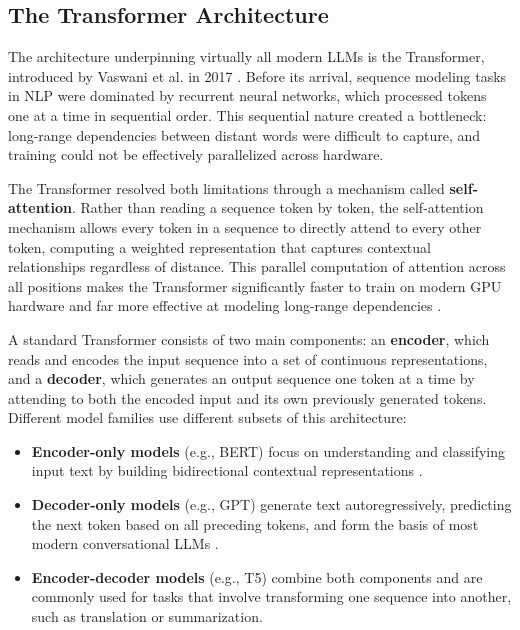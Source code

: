 \subsection{The Transformer Architecture}

The architecture underpinning virtually all modern \ac{LLM}s is the
Transformer, introduced by Vaswani et al. in 2017 \cite{vaswani2017attention}.
Before its arrival, sequence modeling tasks in \ac{NLP} were dominated by
recurrent neural networks, which processed tokens one at a time in sequential
order. This sequential nature created a bottleneck: long-range dependencies
between distant words were difficult to capture, and training could not be
effectively parallelized across hardware.

\vspace{1em}

The Transformer resolved both limitations through a mechanism called
\textbf{self-attention}. Rather than reading a sequence token by token,
the self-attention mechanism allows every token in a sequence to directly
attend to every other token, computing a weighted representation that
captures contextual relationships regardless of distance. This parallel
computation of attention across all positions makes the Transformer
significantly faster to train on modern \ac{GPU} hardware and far more
effective at modeling long-range dependencies \cite{vaswani2017attention}.

\vspace{1em}

A standard Transformer consists of two main components: an \textbf{encoder},
which reads and encodes the input sequence into a set of continuous
representations, and a \textbf{decoder}, which generates an output sequence
one token at a time by attending to both the encoded input and its own
previously generated tokens. Different model families use different
subsets of this architecture:

\begin{itemize}
    \item \textbf{Encoder-only models} (e.g., \ac{BERT}) focus on
    understanding and classifying input text by building bidirectional
    contextual representations \cite{devlin2019bert}.

    \item \textbf{Decoder-only models} (e.g., \ac{GPT}) generate text
    autoregressively, predicting the next token based on all preceding
    tokens, and form the basis of most modern conversational \ac{LLM}s
    \cite{brown2020gpt3}.

    \item \textbf{Encoder-decoder models} (e.g., T5) combine both
    components and are commonly used for tasks that involve transforming
    one sequence into another, such as translation or summarization.
\end{itemize}

